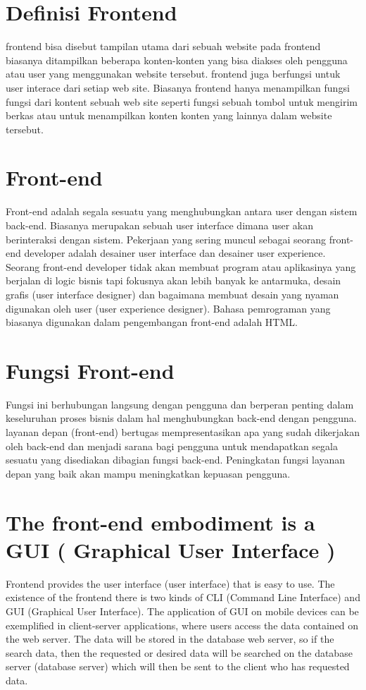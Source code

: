 \section{Definisi Frontend}
frontend bisa disebut tampilan utama dari sebuah website pada frontend biasanya ditampilkan beberapa konten-konten yang bisa diakses oleh pengguna atau user yang menggunakan website tersebut. frontend juga berfungsi untuk user interace dari setiap web site. Biasanya frontend hanya menampilkan fungsi fungsi dari kontent sebuah web site seperti fungsi sebuah tombol untuk mengirim berkas atau untuk menampilkan konten konten yang lainnya dalam website tersebut.

\section{ Front-end}
Front-end adalah  segala sesuatu yang menghubungkan antara user dengan sistem back-end. Biasanya merupakan sebuah user interface 
dimana user akan berinteraksi dengan sistem. Pekerjaan yang sering muncul sebagai seorang front-end developer adalah desainer user interface
dan desainer user experience. Seorang front-end developer tidak akan membuat program atau aplikasinya yang berjalan di logic bisnis 
tapi fokusnya akan lebih banyak ke antarmuka, desain grafis (user interface designer) dan bagaimana membuat desain yang nyaman
digunakan oleh user (user experience designer). Bahasa pemrograman yang biasanya digunakan dalam pengembangan front-end adalah HTML.

\section{Fungsi Front-end}
Fungsi ini berhubungan langsung dengan pengguna dan berperan penting dalam keseluruhan proses bisnis dalam hal menghubungkan 
back-end dengan pengguna. layanan depan (front-end) bertugas mempresentasikan apa yang sudah dikerjakan oleh back-end
dan menjadi sarana bagi pengguna untuk mendapatkan segala sesuatu yang disediakan dibagian fungsi back-end. Peningkatan fungsi layanan depan yang baik akan mampu meningkatkan kepuasan pengguna.

\section{The front-end embodiment is a GUI ( Graphical User Interface )}
Frontend provides the user interface (user interface) that is easy to use. The existence of the frontend there is two kinds of CLI (Command Line Interface) and GUI (Graphical User Interface). The application of GUI on mobile devices can be exemplified in client-server applications, where users access the data contained on the web server. The data will be stored in the database web server, so if the search data, then the requested or desired data will be searched on the database server (database server) which will then be sent to the client who has requested data.

